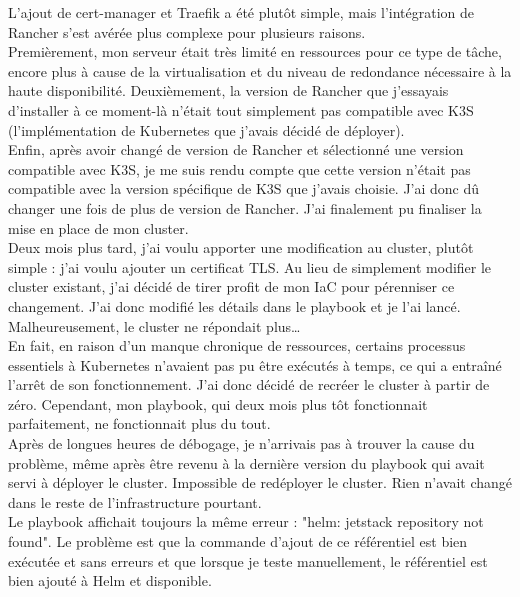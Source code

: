 L'ajout de cert-manager et Traefik a été plutôt simple, mais l'intégration de Rancher s'est avérée plus complexe pour plusieurs raisons.\\

Premièrement, mon serveur était très limité en ressources pour ce type de tâche, encore plus à cause de la virtualisation
et du niveau de redondance nécessaire à la haute disponibilité.
Deuxièmement, la version de Rancher que j'essayais d'installer à ce moment-là n'était tout simplement pas compatible avec K3S
(l'implémentation de Kubernetes que j'avais décidé de déployer).\\

Enfin, après avoir changé de version de Rancher et sélectionné une version compatible avec K3S,
je me suis rendu compte que cette version n'était pas compatible avec la version spécifique de K3S que j'avais choisie.
J'ai donc dû changer une fois de plus de version de Rancher.
J'ai finalement pu finaliser la mise en place de mon cluster.\\

Deux mois plus tard, j'ai voulu apporter une modification au cluster, plutôt simple : j'ai voulu ajouter un certificat TLS.
Au lieu de simplement modifier le cluster existant, j'ai décidé de tirer profit de mon IaC pour pérenniser ce changement.
J'ai donc modifié les détails dans le playbook et je l'ai lancé.
Malheureusement, le cluster ne répondait plus\ldots \\

En fait, en raison d'un manque chronique de ressources, certains processus essentiels
à Kubernetes n'avaient pas pu être exécutés à temps, ce qui a entraîné l'arrêt de son fonctionnement.
J'ai donc décidé de recréer le cluster à partir de zéro.
Cependant, mon playbook, qui deux mois plus tôt fonctionnait parfaitement, ne fonctionnait plus du tout.\\

Après de longues heures de débogage, je n'arrivais pas à trouver la cause du problème,
même après être revenu à la dernière version du playbook qui avait servi à déployer le cluster.
Impossible de redéployer le cluster.
Rien n'avait changé dans le reste de l'infrastructure pourtant.\\

Le playbook affichait toujours la même erreur : "helm: jetstack repository not found". %
Le problème est que la commande d'ajout de ce référentiel est bien exécutée et sans erreurs et que lorsque je teste manuellement,
le référentiel est bien ajouté à Helm et disponible.\\

